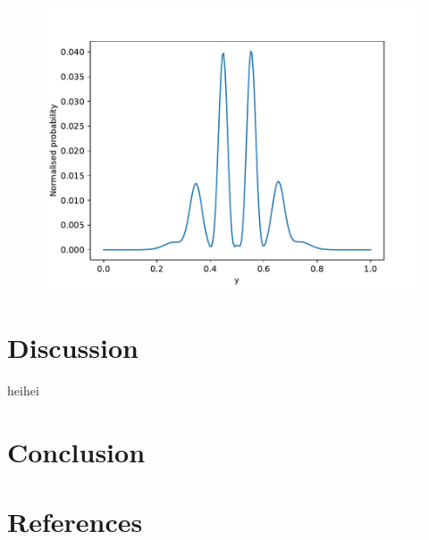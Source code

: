 \documentclass[english,notitlepage,reprint,nofootinbib]{revtex4-2}  %
\begin{document}
	\begin{figure}[h!]
		\centering
		\includegraphics[scale=0.55]{figures/triple_slit_detection.pdf}
		\caption{}
		\label{fig:prob9_triple}
	\end{figure}
	\section{Discussion}\label{sec:discussion}
		heihei
	\section{Conclusion}\label{sec:conclusion}
	
	
	
	
	\onecolumngrid
	\section*{References}
	
	
	
\end{document}
